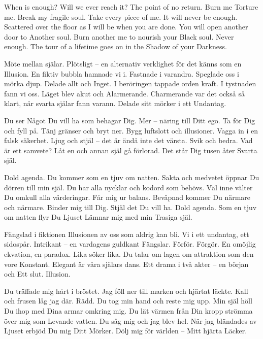 \startpoem
When is enough?
Will we ever reach it?
The point of no return.
Burn me
Torture me.
Break my fragile soul.
Take every piece of me.
It will never be enough.
Scattered over the floor as I will be
when you are done.
You will open another door to 
Another soul.
Burn another me to nourish your 
Black soul.
Never enough.
The tour of a lifetime goes on in the
Shadow of your 
Darkness.
\stoppoem

\startpoem
Möte mellan själar.
Plötsligt – en alternativ verklighet för det känns som en
Illusion.
En fiktiv bubbla hamnade vi i.
Fastnade i varandra.
Speglade oss i mörka djup.
Delade allt och Inget.
I beröringen tappade orden kraft. 
I tystnaden fann vi oss.
Läget blev akut och 
Alarmerande.
Charmerande var det också så klart,
när svarta själar fann varann.
Delade sitt mörker i ett
Undantag.
\stoppoem

\startpoem
Du ser
Något Du vill ha som behagar Dig.
Mer – näring till Ditt ego.
Ta för Dig och fyll på.
Tänj gränser och bryt ner.
Bygg luftslott och illusioner.
Vagga in i en falsk säkerhet.
Ljug och stjäl – det är ändå inte det värsta.
Svik och bedra.
Vad är ett samvete?
Låt en och annan själ gå förlorad.
Det står Dig tusen åter
Svarta själ.
\stoppoem

\startpoem
Dold agenda. 
Du kommer som en tjuv om natten.
Sakta och medvetet öppnar Du dörren till min själ.
Du har alla nycklar och kodord som behövs.
Väl inne välter Du omkull alla värderingar.
Får mig ur balans.
Beväpnad kommer Du  närmare och närmare.
Binder mig till Dig.
Stjäl det Du vill ha.
Dold agenda.
Som en tjuv om natten flyr Du Ljuset
Lämnar mig med min 
Trasiga själ.
\stoppoem

\startpoem
Fängslad i fiktionen
Illusionen av oss som aldrig kan bli.
Vi i ett undantag, ett sidospår.
Intrikant – en vardagens guldkant
Fängslar. Förför.
Förgör.
En omöjlig ekvation, en paradox.
Lika söker lika.
Du talar om lagen om attraktion som den vore
Konstant.
Elegant är våra själars dans.
Ett drama i två akter – en början och 
Ett slut.
Illusion.
\stoppoem

\startpoem
Du träffade mig hårt i bröstet.
Jag föll ner till marken och hjärtat läckte.
Kall och frusen låg jag där.
Rädd.
Du tog min hand och reste mig upp.
Min själ höll Du ihop med Dina armar omkring mig.
Du lät värmen från Din kropp strömma över mig som
Levande vatten.
Du såg mig och jag blev hel.
När jag bländades av Ljuset erbjöd Du mig 
Ditt Mörker.
Dölj mig för världen – 
Mitt hjärta 
Läcker.
\stoppoem

